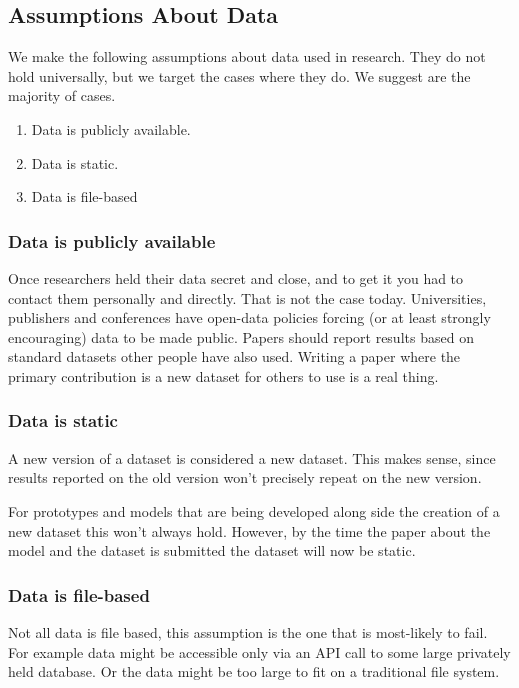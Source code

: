 \documentclass{jors}
\begin{document}
\subsection{Assumptions About Data}
We make the following assumptions about data used in research.
They do not hold universally, but we target the cases where they do.
We suggest are the majority of cases.


\begin{enumerate}
	\item Data is publicly available.
	\item Data is static.
	\item Data is file-based
\end{enumerate}

\subsubsection{Data is publicly available}
Once researchers held their data secret and close, and to get it you had to contact them personally and directly.
That is not the case today.
Universities, publishers and conferences have open-data policies forcing (or at least strongly encouraging) data to be made public.
Papers should report results based on standard datasets other people have also used.
Writing a paper where the primary contribution is a new dataset for others to use is a real thing.





\subsubsection{Data is static}
A new version of a dataset is considered a new dataset.
This makes sense, since results reported on the old version won't precisely repeat on the new version.

For prototypes and models that are being developed along side the creation of a new dataset this won't always hold.
However, by the time the paper about the model and the dataset is submitted the dataset will now be static.

\subsubsection{Data is file-based}
Not all data is file based, this assumption is the one that is most-likely to fail.
For example data might be accessible only via an API call to some large privately held database.
Or the data might be too large to fit on a traditional file system.
\end{document}
